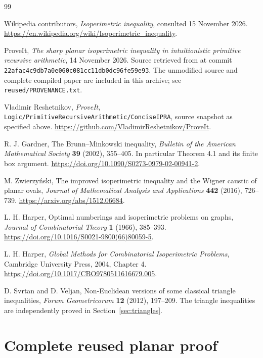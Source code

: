 \documentclass[11pt,a4paper]{article}
\theoremstyle{definition}
\begin{document}
\begin{thebibliography}{99}
\raggedright
{}
Wikipedia contributors, \emph{Isoperimetric inequality}, consulted
15 November 2026.
\url{https://en.wikipedia.org/wiki/Isoperimetric_inequality}.

ProveIt, \emph{The sharp planar isoperimetric inequality in intuitionistic
primitive recursive arithmetic}, 14 November 2026. Source retrieved from
 at commit
\texttt{22afac4c9db7a0e060c081cc11db0dc96fe59e93}.
The unmodified source and complete compiled paper are included in this
archive; see \texttt{reused/PROVENANCE.txt}.

Vladimir Reshetnikov, \emph{ProveIt},
\texttt{Logic/PrimitiveRecursiveArithmetic/ConciseIPRA},
source snapshot as specified above.
\url{https://github.com/VladimirReshetnikov/ProveIt}.

R. J. Gardner, The Brunn--Minkowski inequality,
\emph{Bulletin of the American Mathematical Society} \textbf{39} (2002),
355--405. In particular Theorem 4.1 and its finite box argument.
\url{https://doi.org/10.1090/S0273-0979-02-00941-2}.

M. Zwierzy\'nski, The improved isoperimetric inequality and the Wigner
caustic of planar ovals, \emph{Journal of Mathematical Analysis and
Applications} \textbf{442} (2016), 726--739.
\url{https://arxiv.org/abs/1512.06684}.

L. H. Harper, Optimal numberings and isoperimetric problems on graphs,
\emph{Journal of Combinatorial Theory} \textbf{1} (1966), 385--393.
\url{https://doi.org/10.1016/S0021-9800(66)80059-5}.

L. H. Harper, \emph{Global Methods for Combinatorial Isoperimetric Problems},
Cambridge University Press, 2004, Chapter 4.
\url{https://doi.org/10.1017/CBO9780511616679.005}.

D. Svrtan and D. Veljan, Non-Euclidean versions of some classical triangle
inequalities, \emph{Forum Geometricorum} \textbf{12} (2012), 197--209.
The triangle inequalities are independently proved in
Section~\ref{sec:triangles}.
\end{thebibliography}

\clearpage
\appendix
\section{Complete reused planar proof}
\label{app:planar-full}
\end{document}
